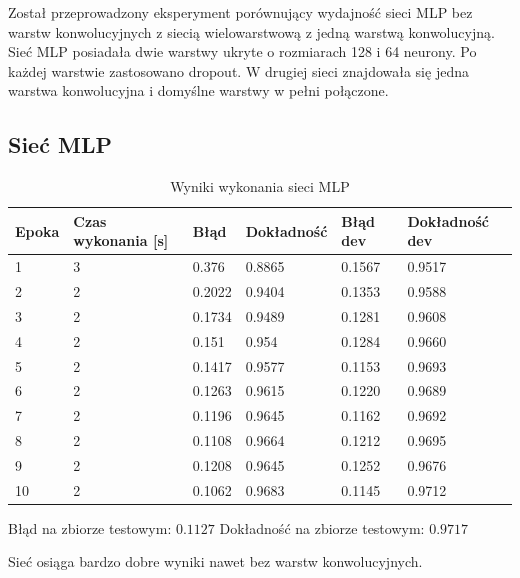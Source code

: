 \documentclass{article}
\begin{document}
Został przeprowadzony eksperyment porównujący wydajność sieci MLP bez warstw konwolucyjnych z siecią wielowarstwową z jedną warstwą konwolucyjną.
Sieć MLP posiadała dwie warstwy ukryte o rozmiarach 128 i 64 neurony. Po każdej warstwie zastosowano dropout. W drugiej sieci znajdowała się jedna warstwa
konwolucyjna i domyślne warstwy w pełni połączone.

\subsection{Sieć MLP}

\begin{table}[h]
  \centering
    
  \bgroup
  \def\arraystretch{1.3}
\begin{tabular}{|l|l|l|l|l|l|}
\hline
Epoka & Czas wykonania [s] & Błąd & Dokładność & Błąd dev & Dokładność dev \\ \hline
1 & 3 & 0.376 & 0.8865 & 0.1567 & 0.9517 \\ \hline
2 & 2 & 0.2022 & 0.9404 & 0.1353 & 0.9588 \\ \hline
3 & 2 & 0.1734 &  0.9489 & 0.1281 & 0.9608 \\ \hline
4 & 2 & 0.151 &  0.954 & 0.1284 & 0.9660 \\ \hline
5 & 2 & 0.1417 & 0.9577 & 0.1153 & 0.9693 \\ \hline
6 & 2 & 0.1263 & 0.9615 & 0.1220 & 0.9689 \\ \hline
7 & 2 & 0.1196 & 0.9645 & 0.1162 & 0.9692 \\ \hline
8 & 2 & 0.1108 & 0.9664 & 0.1212 & 0.9695 \\ \hline
9 & 2 & 0.1208 & 0.9645 & 0.1252 & 0.9676 \\ \hline
10 & 2 & 0.1062 & 0.9683 & 0.1145 & 0.9712 \\ \hline
\end{tabular}
  \egroup
  \vspace{10pt}
  \caption{Wyniki wykonania sieci MLP}
\end{table}

Błąd na zbiorze testowym: $0.1127$ \newline
Dokładność na zbiorze testowym: $0.9717$

Sieć osiąga bardzo dobre wyniki nawet bez warstw konwolucyjnych.
\end{document}
